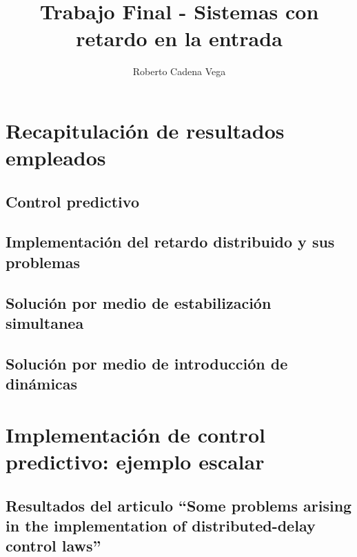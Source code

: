 \documentclass{article}
\title{Trabajo Final - Sistemas con retardo en la entrada}
\author{Roberto Cadena Vega}
\begin{document}
    
    
    \maketitle

    
    
    \section{Recapitulación de resultados
empleados}\label{recapitulaciuxf3n-de-resultados-empleados}

    \subsection{Control predictivo}\label{control-predictivo}

    \subsection{Implementación del retardo distribuido y sus
problemas}\label{implementaciuxf3n-del-retardo-distribuido-y-sus-problemas}

    \subsection{Solución por medio de estabilización
simultanea}\label{soluciuxf3n-por-medio-de-estabilizaciuxf3n-simultanea}

    \subsection{Solución por medio de introducción de
dinámicas}\label{soluciuxf3n-por-medio-de-introducciuxf3n-de-dinuxe1micas}

    \section{Implementación de control predictivo: ejemplo
escalar}\label{implementaciuxf3n-de-control-predictivo-ejemplo-escalar}

    \subsection{\texorpdfstring{Resultados del articulo ``Some problems
arising in the implementation of distributed-delay control
laws''}{Resultados del articulo Some problems arising in the implementation of distributed-delay control laws}}\label{resultados-del-articulo-some-problems-arising-in-the-implementation-of-distributed-delay-control-laws}
\end{document}
